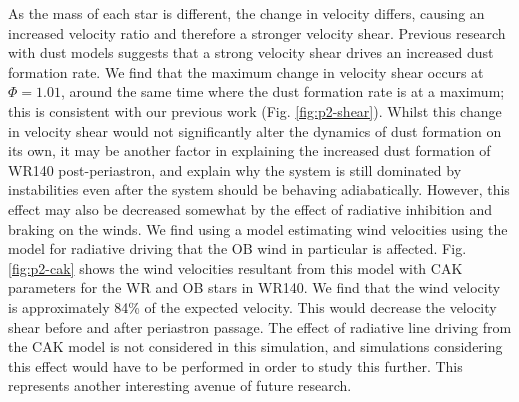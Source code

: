 \noindent
As the mass of each star is different, the change in velocity differs, causing an increased velocity ratio and therefore a stronger velocity shear.
Previous research with dust models suggests that a strong velocity shear drives an increased dust formation rate.
We find that the maximum change in velocity shear occurs at $\Phi = 1.01$, around the same time where the dust formation rate is at a maximum; this is consistent with our previous work (Fig. \ref{fig:p2-shear}).
Whilst this change in velocity shear would not significantly alter the dynamics of dust formation on its own, it may be another factor in explaining the increased dust formation of WR140 post-periastron, and explain why the system is still dominated by instabilities even after the system should be behaving adiabatically.
However, this effect may also be decreased somewhat by the effect of radiative inhibition and braking on the winds.
We find using a model estimating wind velocities using the \textcite*{castor_radiation-driven_1975} model for radiative driving that the OB wind in particular is affected.
Fig. \ref{fig:p2-cak} shows the wind velocities resultant from this model with CAK parameters for the WR and OB stars in WR140.
We find that the wind velocity is approximately 84\% of the expected velocity.
This would decrease the velocity shear before and after periastron passage.
The effect of radiative line driving from the CAK model is not considered in this simulation, and simulations considering this effect would have to be performed in order to study this further.
This represents another interesting avenue of future research.




